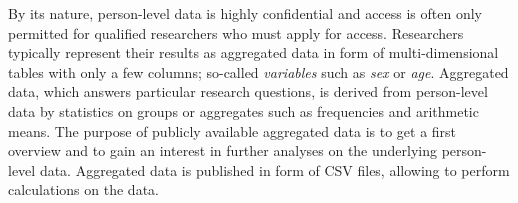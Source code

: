 \documentclass{llncs}
\newcommand{\tb}[1]{\todo[size=\small, color=green!40]{\textbf{Thomas:} #1}}
\begin{document}
By its nature, person-level data is highly confidential and access is often only permitted for qualified researchers who must apply for access. 
Researchers typically represent their results as aggregated data in form of multi-dimensional tables with only a few columns; so-called \emph{variables} such as \emph{sex} or \emph{age}.
Aggregated data, which answers particular research questions, is derived from person-level data by statistics on groups or aggregates such as frequencies and arithmetic means.
The purpose of publicly available aggregated data is to get a first overview and to gain an interest in further analyses on the underlying person-level data.
Aggregated data is published in form of CSV files,
allowing to perform calculations on the data.
\end{document}
